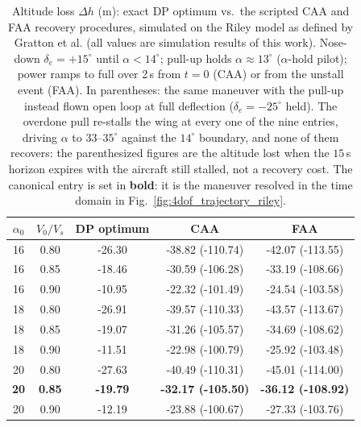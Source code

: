 \begin{table}[!ht]
    \centering
    \caption{Altitude loss $\Delta h$ (m): exact DP optimum vs.\ the scripted CAA and FAA recovery procedures, simulated on the Riley model as defined by Gratton et al. (all values are simulation results of this work). Nose-down $\delta_e=+15^\circ$ until $\alpha<14^\circ$; pull-up holds $\alpha\approx13^\circ$ ($\alpha$-hold pilot); power ramps to full over 2\,s from $t=0$ (CAA) or from the unstall event (FAA). In parentheses: the same maneuver with the pull-up instead flown open loop at full deflection ($\delta_e=-25^\circ$ held). The overdone pull re-stalls the wing at every one of the nine entries, driving $\alpha$ to $33$--$35^\circ$ against the $14^\circ$ boundary, and none of them recovers: the parenthesized figures are the altitude lost when the $15$\,s horizon expires with the aircraft still stalled, not a recovery cost. The canonical entry is set in \textbf{bold}: it is the maneuver resolved in the time domain in Fig.~\ref{fig:4dof_trajectory_riley}.}
    \label{tab:maneuvers}
    \begin{tabular}{ccccc}
        \hline
        $\alpha_0$ & $V_0/V_s$ & DP optimum & CAA & FAA \\
        \hline
        16 & 0.80 & -26.30 & -38.82 (-110.74) & -42.07 (-113.55) \\
        16 & 0.85 & -18.46 & -30.59 (-106.28) & -33.19 (-108.66) \\
        16 & 0.90 & -10.95 & -22.32 (-101.49) & -24.54 (-103.58) \\
        18 & 0.80 & -26.91 & -39.57 (-110.33) & -43.57 (-113.67) \\
        18 & 0.85 & -19.07 & -31.26 (-105.57) & -34.69 (-108.62) \\
        18 & 0.90 & -11.51 & -22.98 (-100.79) & -25.92 (-103.48) \\
        20 & 0.80 & -27.63 & -40.49 (-110.31) & -45.01 (-114.00) \\
        \bfseries 20 & \bfseries 0.85 & \bfseries -19.79 & \bfseries -32.17 (-105.50) & \bfseries -36.12 (-108.92) \\
        20 & 0.90 & -12.19 & -23.88 (-100.67) & -27.33 (-103.76) \\
        \hline
    \end{tabular}
\end{table}
